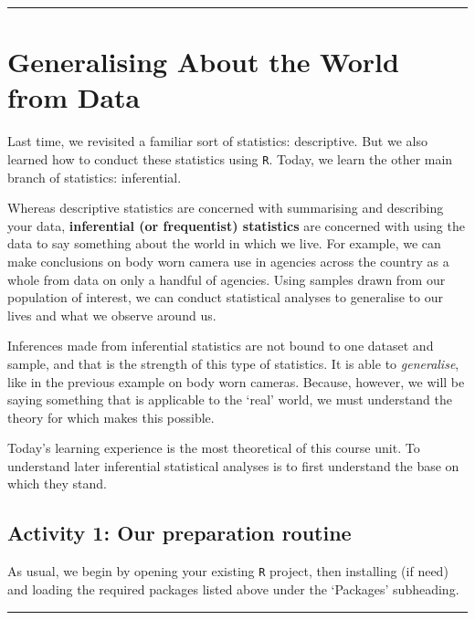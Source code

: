 \documentclass[
]{book}
\begin{document}
\begin{center}\rule{0.5\linewidth}{0.5pt}\end{center}

\hypertarget{generalising-about-the-world-from-data}{%
\section{Generalising About the World from Data}\label{generalising-about-the-world-from-data}}

Last time, we revisited a familiar sort of statistics: descriptive. But we also learned how to conduct these statistics using \texttt{R}. Today, we learn the other main branch of statistics: inferential.

Whereas descriptive statistics are concerned with summarising and describing your data, \textbf{inferential (or frequentist) statistics} are concerned with using the data to say something about the world in which we live. For example, we can make conclusions on body worn camera use in agencies across the country as a whole from data on only a handful of agencies. Using samples drawn from our population of interest, we can conduct statistical analyses to generalise to our lives and what we observe around us.

Inferences made from inferential statistics are not bound to one dataset and sample, and that is the strength of this type of statistics. It is able to \emph{generalise}, like in the previous example on body worn cameras. Because, however, we will be saying something that is applicable to the `real' world, we must understand the theory for which makes this possible.

Today's learning experience is the most theoretical of this course unit. To understand later inferential statistical analyses is to first understand the base on which they stand.

\hypertarget{activity-1-our-preparation-routine-1}{%
\subsection{Activity 1: Our preparation routine}\label{activity-1-our-preparation-routine-1}}

As usual, we begin by opening your existing \texttt{R} project, then installing (if need) and loading the required packages listed above under the `Packages' subheading.

\begin{center}\rule{0.5\linewidth}{0.5pt}\end{center}
\end{document}
